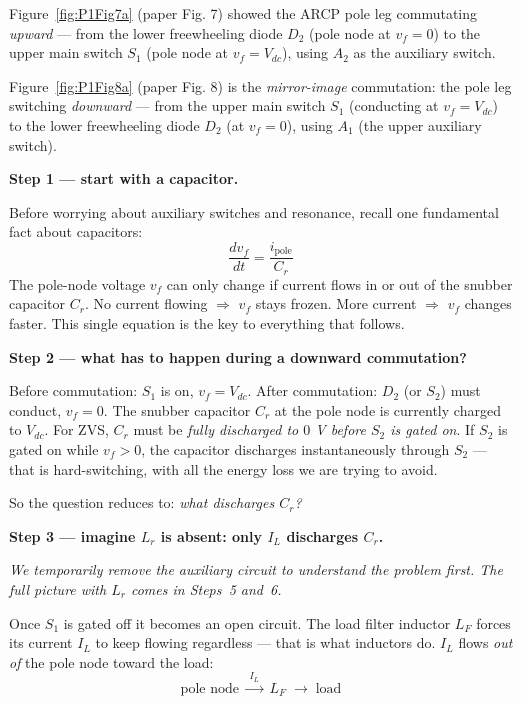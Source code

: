 \documentclass[12pt, a4paper]{article}
\def\,{ }%
\newcommand{\Vdc}{V_{dc}}
\newcommand{\vf}{v_f}
\newcommand{\IL}{I_L}
\newcommand{\Lr}{L_r}
\newcommand{\figref}[1]{Figure~\ref{#1}}
\begin{document}
\figref{fig:P1Fig7a} (paper Fig.\,7) showed the ARCP pole leg commutating
\emph{upward} --- from the lower freewheeling diode $D_2$ (pole node at
$\vf = 0$) to the upper main switch $S_1$ (pole node at $\vf = \Vdc$),
using $A_2$ as the auxiliary switch.

\figref{fig:P1Fig8a} (paper Fig.\,8) is the \emph{mirror-image}
commutation: the pole leg switching \emph{downward} --- from the upper main
switch $S_1$ (conducting at $\vf = \Vdc$) to the lower freewheeling diode
$D_2$ (at $\vf = 0$), using $A_1$ (the upper auxiliary switch).

\medskip
\textbf{Step 1 — start with a capacitor.}

Before worrying about auxiliary switches and resonance, recall one
fundamental fact about capacitors:
\begin{equation}
    \frac{d\vf}{dt} = \frac{i_\text{pole}}{C_r}
    \label{eq:cap_discharge}
\end{equation}
The pole-node voltage $\vf$ can only change if current flows in or out of
the snubber capacitor $C_r$.
No current flowing $\Rightarrow$ $\vf$ stays frozen.
More current $\Rightarrow$ $\vf$ changes faster.
This single equation is the key to everything that follows.

\medskip
\textbf{Step 2 — what has to happen during a downward commutation?}

Before commutation: $S_1$ is on, $\vf = \Vdc$.
After commutation: $D_2$ (or $S_2$) must conduct, $\vf = 0$.
The snubber capacitor $C_r$ at the pole node is currently charged to
$\Vdc$.
For ZVS, $C_r$ must be \emph{fully discharged to $0$\,V before $S_2$ is
gated on}.
If $S_2$ is gated on while $\vf > 0$, the capacitor discharges
instantaneously through $S_2$ --- that is hard-switching, with all the
energy loss we are trying to avoid.

So the question reduces to: \emph{what discharges $C_r$?}

\medskip
\textbf{Step 3 — imagine $\Lr$ is absent: only $\IL$ discharges $C_r$.}

\textit{We temporarily remove the auxiliary circuit to understand the
problem first.  The full picture with $\Lr$ comes in Steps~5 and~6.}

Once $S_1$ is gated off it becomes an open circuit.
The load filter inductor $L_F$ forces its current $\IL$ to keep flowing
regardless --- that is what inductors do.
$\IL$ flows \emph{out of} the pole node toward the load:
\[
    \text{pole node} \;\xrightarrow{\;I_L\;}\; L_F \;\longrightarrow\;
    \text{load}
\]
\end{document}
